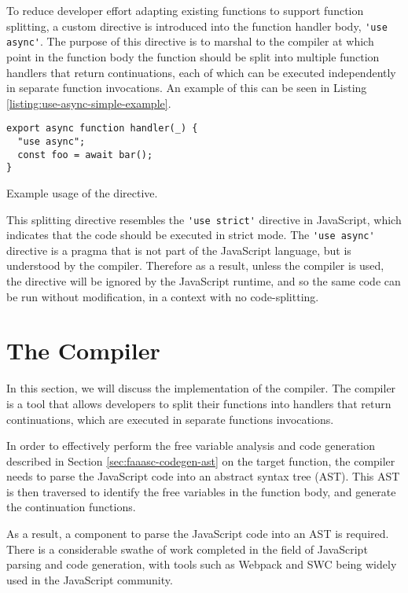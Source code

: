 To reduce developer effort adapting existing functions to support function splitting, a custom directive is introduced into the function handler body, \verb|'use async'|. The purpose of this directive is to marshal to the \faaasc{} compiler at which point in the function body the function should be split into multiple function handlers that return continuations, each of which can be executed independently in separate \awslambda{} function invocations. An example of this can be seen in Listing \ref{listing:use-async-simple-example}.

\begin{listing}[H]
\begin{verbatim}
export async function handler(_) {
  "use async";
  const foo = await bar();
}
\end{verbatim}
\caption{Example usage of the directive.}
\label{listing:use-async-simple-example}
\end{listing}

This splitting directive resembles the \verb|'use strict'| directive in JavaScript, which indicates that the code should be executed in strict mode. The \verb|'use async'| directive is a pragma that is not part of the JavaScript language, but is understood by the \faaasc{} compiler. Therefore as a result, unless the \faaasc{} compiler is used, the directive will be ignored by the JavaScript runtime, and so the same code can be run without modification, in a context with no code-splitting.

\section{The \faaasc{} Compiler}
In this section, we will discuss the implementation of the \faaasc{} compiler. The \faaasc{} compiler is a tool that allows developers to split their functions into handlers that return continuations, which are executed in separate \awslambda{} functions invocations.

In order to effectively perform the free variable analysis and code generation described in Section \ref{sec:faaasc-codegen-ast} on the target \faas{} function, the \faaasc{} compiler needs to parse the JavaScript code into an abstract syntax tree (AST). This AST is then traversed to identify the free variables in the function body, and generate the continuation functions.

As a result, a component to parse the JavaScript code into an AST is required. There is a considerable swathe of work completed in the field of JavaScript parsing and code generation, with tools such as Webpack\cite{Webpack} and SWC\cite{RustbasedPlatformWeb} being widely used in the JavaScript community.

